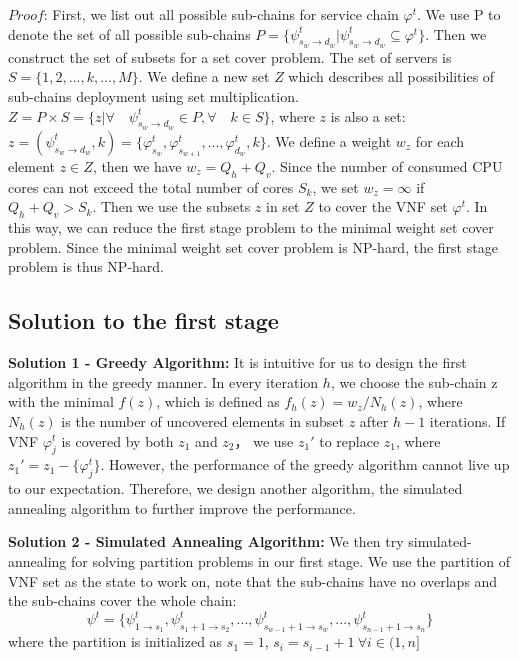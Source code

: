 \documentclass{acmtog}
\begin{document}
\noindent $Proof$: First, we list out all possible sub-chains for service chain $\varphi^t$. We use P to denote the set of all possible sub-chains $P=\{\psi^t_{s_w\to d_w}|\psi^t_{s_w\to d_w}\subseteq\varphi^t\}$. Then we construct the set of subsets for a set cover problem. The set of servers is $S=\{1,2,...,k,...,M\}$. We define a new set $Z$ which describes all possibilities of sub-chains deployment using set multiplication. $Z=P\times S=\{z|\forall\quad \psi^t_{s_w\to d_w}\in P, \forall\quad k\in S \}$, where $z$ is also a set: $z=(\psi^t_{s_w\to d_w},k) = \{\varphi^t_{s_w},\varphi^t_{s_{w+1}},...,\varphi^t_{d_w},k\}$. We define a weight $w_z$ for each element $z\in Z$, then we have $w_z=Q_h+Q_v$. Since the number of consumed CPU cores can not exceed the total number of cores $S_k$, we set $w_z = \infty$ if $Q_h + Q_v > S_k$. Then we use the subsets $z$
in set $Z$ to cover the VNF set $\varphi^t$. In this way, we can reduce the first stage problem to the minimal weight set cover problem. Since the minimal weight set cover problem is NP-hard, the first stage problem is thus NP-hard.









\subsection{Solution to the first stage}
\noindent \textbf{Solution 1 - Greedy Algorithm: }
It is intuitive for us to design the first algorithm in the greedy manner. In every iteration $h$, we choose the sub-chain z with the minimal $f(z)$, which is defined as $f_h(z)=w_z/N_h(z)$, where $N_h(z)$ is the number of uncovered elements in subset $z$ after $h-1$ iterations. If VNF $\varphi^t_j$ is covered by both $z_1$ and $z_2$， we use $z_1'$ to replace $z_1$, where $z_1'=z_1-\{\varphi^t_j\}$.
However, the performance of the greedy algorithm cannot live up to our expectation. Therefore, we design another algorithm, the simulated annealing algorithm to further improve the performance.


\vspace{2ex}
\noindent\textbf{Solution 2 - Simulated Annealing Algorithm:}
We then try simulated-annealing for solving partition problems in our first stage. We use the partition of VNF set as the state to work on, note that the sub-chains have no overlaps and the sub-chains cover the whole chain:
\vspace{-2ex}
$$\psi^t=\{\psi^t_{1\to s_1},\psi^t_{s_1+1\to s_2},...,\psi^t_{s_{w-1}+1\to s_w},...,\psi^t_{s_{n-1}+1\to s_n}\}$$
where the partition is initialized as $s_1 = 1$, $s_i = s_{i-1} + 1 \ \forall i \in (1,n]$
\end{document}
